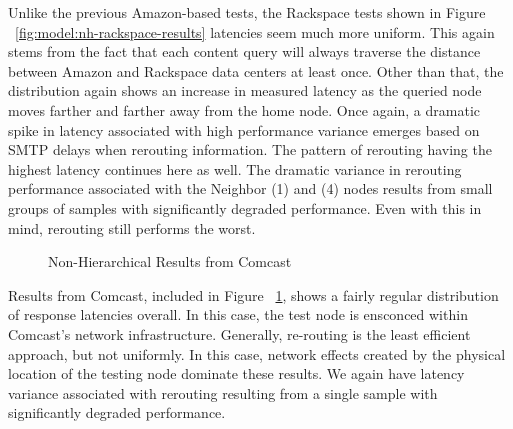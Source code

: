 Unlike the previous Amazon-based tests, the Rackspace tests shown in Figure ~\ref{fig:model:nh-rackspace-results} latencies seem much more uniform.  This again stems from the fact that each content query will always traverse the distance between Amazon and Rackspace data centers at least once.  Other than that, the distribution again shows an increase in measured latency as the queried node moves farther and farther away from the home node.  Once again, a dramatic spike in latency  associated with high performance variance emerges based on SMTP delays when rerouting information.  The pattern of rerouting having the highest latency continues here as well.  The dramatic variance in rerouting performance associated with the Neighbor (1) and (4) nodes results from small groups of samples with significantly degraded performance.  Even with this in mind, rerouting still performs the worst.



\begin{figure}[htbp]
\begin{minipage}[b]{0.5\linewidth}
\centering
{}
\end{minipage}
\begin{minipage}[b]{0.5\linewidth}
\centering
{}
\end{minipage}
\caption{Non-Hierarchical Results from Comcast}
\label{fig:model:nh-comcast-results}
\end{figure}

Results from Comcast, included in Figure ~\ref{fig:model:nh-comcast-results}, shows a fairly regular distribution of response latencies overall.  In this case, the test node is ensconced within Comcast's network infrastructure.  Generally, re-routing is the least efficient approach, but not uniformly.  In this case, network effects created by the physical location of the testing node dominate these results.  We again have latency variance associated with rerouting resulting from a single sample with significantly degraded performance.

